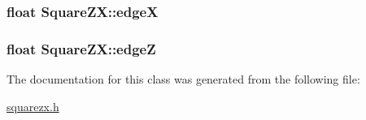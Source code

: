 \subsubsection[{\texorpdfstring{edgeX}{edgeX}}]{\setlength{\rightskip}{0pt plus 5cm}float Square\+Z\+X\+::edgeX\hspace{0.3cm}{\ttfamily [private]}}\hypertarget{classSquareZX_a7e460f5cda678eb9c3860303395adc8e}{}\label{classSquareZX_a7e460f5cda678eb9c3860303395adc8e}
\subsubsection[{\texorpdfstring{edgeZ}{edgeZ}}]{\setlength{\rightskip}{0pt plus 5cm}float Square\+Z\+X\+::edgeZ\hspace{0.3cm}{\ttfamily [private]}}\hypertarget{classSquareZX_a3f05799d20b98477ea21d7479ba32e16}{}\label{classSquareZX_a3f05799d20b98477ea21d7479ba32e16}


The documentation for this class was generated from the following file\+:\begin{DoxyCompactItemize}
\item 
\hyperlink{squarezx_8h}{squarezx.\+h}\end{DoxyCompactItemize}
